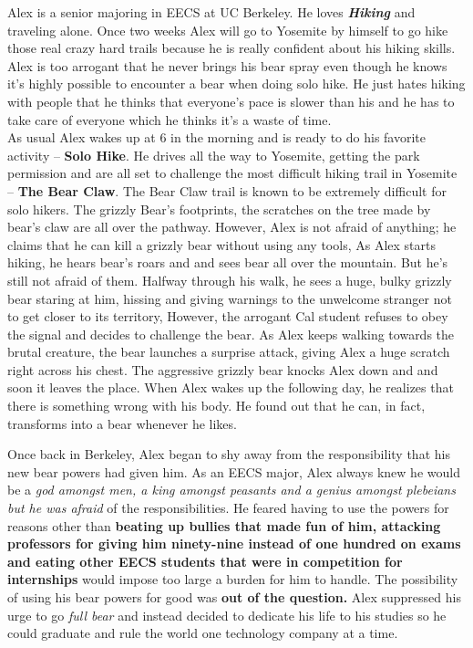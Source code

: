 \documentclass{article}
\begin{document}
Alex is a senior majoring in EECS at UC Berkeley. He loves \textbf{\textit{Hiking}} and traveling alone. Once two weeks Alex will go to Yosemite by himself to go hike those real crazy hard trails because he is really confident about his hiking skills. Alex is too arrogant that he never brings his bear spray even though he knows it’s highly possible to encounter a bear when doing solo hike. He just hates hiking with people that he thinks that everyone’s pace is slower than his and he has to take care of everyone which he thinks it's a waste of time. \\
\newline
	\indent As usual Alex wakes up at 6 in the morning and is ready to do his favorite activity -- \textbf{Solo Hike}. He drives all the way to Yosemite, getting the park permission and are all set to challenge the most difficult hiking trail in Yosemite -- \textbf{The Bear Claw}. The Bear Claw trail is known to be extremely difficult for solo hikers. The grizzly Bear’s footprints, the scratches on the tree made by bear’s claw are all over the pathway. However, Alex is not afraid of anything; he claims that he can kill a grizzly bear without using any tools, As Alex starts hiking, he hears bear’s roars and and sees bear all over the mountain. But he’s still not afraid of them. Halfway through his walk, he sees a huge, bulky grizzly bear staring at him, hissing and giving warnings to the unwelcome stranger not to get closer to its territory, However, the arrogant Cal student refuses to obey the signal and decides to challenge the bear. As Alex keeps walking towards the brutal creature, the bear launches a surprise attack, giving Alex a huge scratch right across his chest. The aggressive grizzly bear knocks Alex down and and soon it leaves the place. When Alex wakes up the following day, he realizes that there is something wrong with his body. He found out that he can, in fact, transforms into a bear whenever he likes.

Once back in Berkeley, Alex began to shy away from the responsibility that his new bear powers had given him. As an EECS major, Alex always knew he would be a \textit {god amongst \emph {men}, a king amongst \emph {peasants} and a genius amongst \emph {plebeians} but he was afraid} of the responsibilities. He feared having to use the powers for reasons other than \textbf {beating up bullies that made fun of him, attacking professors for giving him ninety-nine instead of one hundred on exams and eating other EECS students that were in competition for internships} would impose too large a burden for him to handle. The possibility of using his bear powers for good was \textbf {out of the question.} Alex suppressed his urge to go \textit {full bear} and instead decided to dedicate his life to his studies so he could graduate and rule the world one technology company at a time. 
\end{document}
